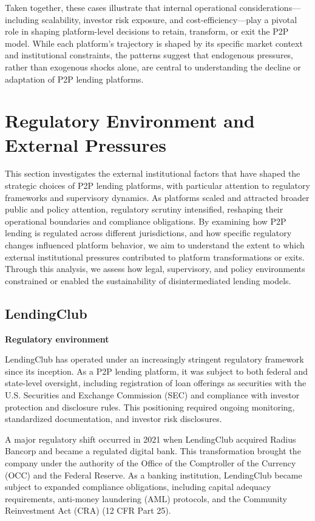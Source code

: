 \documentclass[pdflatex,sn-apa]{sn-jnl}%
\theoremstyle{thmstyleone}%
\theoremstyle{thmstyletwo}%
\theoremstyle{thmstylethree}%
\begin{document}
Taken together, these cases illustrate that internal operational considerations—including scalability, investor risk exposure, and cost-efficiency—play a pivotal role in shaping platform-level decisions to retain, transform, or exit the P2P model. While each platform’s trajectory is shaped by its specific market context and institutional constraints, the patterns suggest that endogenous pressures, rather than exogenous shocks alone, are central to understanding the decline or adaptation of P2P lending platforms.

\section{Regulatory Environment and External Pressures}
\label{sec:external_factors}
This section investigates the external institutional factors that have shaped the strategic choices of P2P lending platforms, with particular attention to regulatory frameworks and supervisory dynamics. As platforms scaled and attracted broader public and policy attention, regulatory scrutiny intensified, reshaping their operational boundaries and compliance obligations. By examining how P2P lending is regulated across different jurisdictions, and how specific regulatory changes influenced platform behavior, we aim to understand the extent to which external institutional pressures contributed to platform transformations or exits. Through this analysis, we assess how legal, supervisory, and policy environments constrained or enabled the sustainability of disintermediated lending models.

\subsection{LendingClub}

\textbf{Regulatory environment}

LendingClub has operated under an increasingly stringent regulatory framework since its inception. As a P2P lending platform, it was subject to both federal and state-level oversight, including registration of loan offerings as securities with the U.S. Securities and Exchange Commission (SEC) and compliance with investor protection and disclosure rules. This positioning required ongoing monitoring, standardized documentation, and investor risk disclosures.

A major regulatory shift occurred in 2021 when LendingClub acquired Radius Bancorp and became a regulated digital bank. This transformation brought the company under the authority of the Office of the Comptroller of the Currency (OCC) and the Federal Reserve. As a banking institution, LendingClub became subject to expanded compliance obligations, including capital adequacy requirements, anti-money laundering (AML) protocols, and the Community Reinvestment Act (CRA) (12 CFR Part 25).
\end{document}
